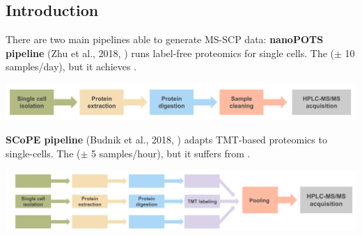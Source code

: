 \documentclass{article}
\begin{document}
\setlength{\columnsep}{0.5cm}
\begin{multicols}{2}

\noindent
\begin{minipage}[t]{\linewidth}
  \vspace{0.5cm}
  \section*{\huge Introduction}
  \large
  There are two main pipelines able to generate MS-SCP data:
  \textbf{\large nanoPOTS pipeline} (Zhu et al., 2018, \cite{Zhu2018-bf}) runs label-free proteomics for single cells. The \textbf{\color{BrickRed}{throughput is low}} ($\pm$ 10 samples/day), but it achieves \textbf{\color{OliveGreen}{accurate peptide quantification}}. 
    \vspace{-0.3cm}
    \begin{center}
      \includegraphics[width=0.87\linewidth]{figs/nanopots.png} \\
    \end{center}
    \vspace{-0.3cm}
  \textbf{\large SCoPE pipeline} (Budnik et al., 2018, \cite{Budnik2018-qh}) adapts TMT-based proteomics to single-cells. The \textbf{\color{OliveGreen}{throughput is higher}} ($\pm$ 5 samples/hour), but it suffers from \textbf{\color{BrickRed}{presence of chemical noise}}.
    \begin{center}
      \includegraphics[width=0.9\linewidth]{figs/scopems.png} \\
    \end{center}
    \vspace{-0.3cm}
\end{minipage}

\noindent
\begin{minipage}[t]{\linewidth}
  \vspace{0.55cm}

\end{minipage}
\end{multicols}
\end{document}
